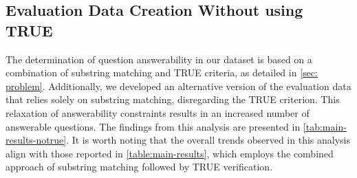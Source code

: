 \documentclass{article} %
\begin{document}
\subsection{Evaluation Data Creation Without using TRUE}
The determination of question answerability in our dataset is based on a combination of substring matching and TRUE criteria, as detailed in \cref{sec: problem}. Additionally, we developed an alternative version of the evaluation data that relies solely on substring matching, disregarding the TRUE criterion. This relaxation of answerability constraints results in an increased number of answerable questions. The findings from this analysis are presented in \cref{tab:main-results-notrue}. It is worth noting that the overall trends observed in this analysis align with those reported in \cref{table:main-results}, which employs the combined approach of substring matching followed by TRUE verification.
\end{document}
